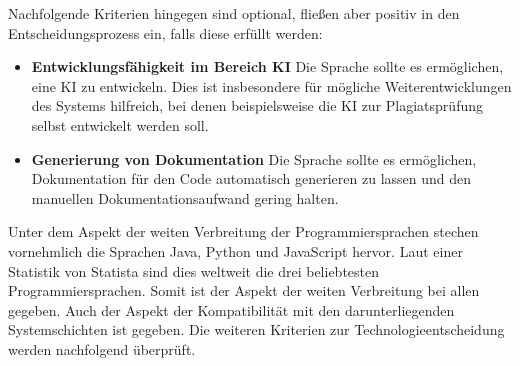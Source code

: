 Nachfolgende Kriterien hingegen sind optional, fließen aber
positiv in den Entscheidungsprozess ein, falls diese erfüllt werden:
\begin{itemize}
    \item \textbf{Entwicklungsfähigkeit im Bereich KI} Die Sprache sollte es ermöglichen, eine KI zu entwickeln.
            Dies ist insbesondere für mögliche Weiterentwicklungen des Systems hilfreich,
            bei denen beispielsweise die KI zur Plagiatsprüfung selbst entwickelt werden soll.
    \item \textbf{Generierung von Dokumentation} Die Sprache sollte es ermöglichen, Dokumentation für den Code
            automatisch generieren zu lassen und den manuellen Dokumentationsaufwand gering halten.
\end{itemize}
Unter dem Aspekt der weiten Verbreitung der Programmiersprachen
stechen vornehmlich die Sprachen Java, Python und JavaScript hervor.
Laut einer Statistik von Statista sind dies weltweit die drei beliebtesten Programmiersprachen\autocite{programmiersprachen}.
Somit ist der Aspekt der weiten Verbreitung bei allen gegeben.
Auch der Aspekt der Kompatibilität mit den darunterliegenden Systemschichten ist gegeben.
Die weiteren Kriterien zur Technologieentscheidung werden nachfolgend überprüft.

